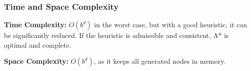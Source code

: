\subsubsection{Time and Space Complexity}
\textbf{Time Complexity:} \( O(b^d) \) in the worst case, but with a good heuristic, it can be significantly reduced. If the heuristic is admissible and consistent, A* is optimal and complete.

\textbf{Space Complexity:} \( O(b^d) \), as it keeps all generated nodes in memory.
